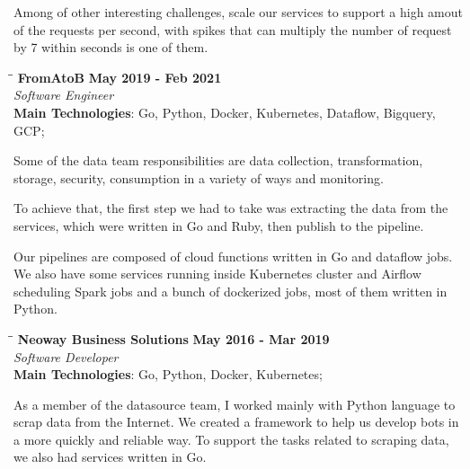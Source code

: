 \documentclass[margin]{res}
\begin{document}
\begin{resume}
Among of other interesting challenges, scale our services to support a high amout of the requests per second, with spikes that can multiply the number of request by 7 within seconds is one of them.


\vspace{-0.1in}
   \begin{tabbing}
   \hspace{2.3in}\= \hspace{1.7in}\= \kill %
    \textbf{FromAtoB}    \>\>\textbf{May 2019 - Feb 2021}\\
    \textit{Software Engineer}\\
    \textbf{Main Technologies}: Go, Python, Docker, Kubernetes, Dataflow, Bigquery, GCP;
   \end{tabbing}\vspace{-20pt}      %
    \vspace{2mm}

Some of the data team responsibilities are data collection, transformation, storage, security, consumption in a variety of ways and monitoring.

To achieve that, the first step we had to take was extracting the data from the services, which were written in Go and Ruby, then publish to the pipeline.

Our pipelines are composed of cloud functions written in Go and dataflow jobs.
We also have some services running inside Kubernetes cluster and Airflow scheduling Spark jobs and a bunch of dockerized jobs, most of them written in Python.


\vspace{-0.1in}
   \begin{tabbing}
   \hspace{2.3in}\= \hspace{1.7in}\= \kill %
    \textbf{Neoway Business Solutions}    \>\>\textbf{May 2016 - Mar 2019}\\
    \textit{Software Developer}\\
    \textbf{Main Technologies}: Go, Python, Docker, Kubernetes;
   \end{tabbing}\vspace{-20pt}      %
    \vspace{2mm}

As a member of the datasource team, I worked mainly with Python language to scrap data from the Internet. We created a framework to help us develop bots in a more quickly and reliable way.
To support the tasks related to scraping data, we also had services written in Go.



\end{resume}
\end{document}
